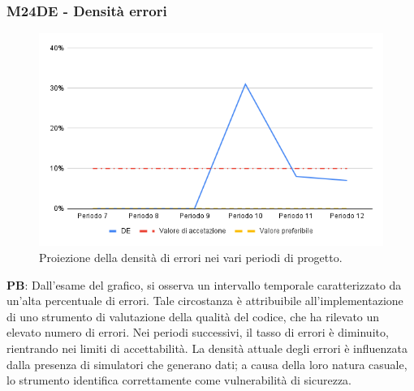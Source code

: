\subsubsection{M24DE - Densità errori}
\begin{figure}[H]
    \centering
    \includegraphics[width=1\textwidth]{../Images/PianoDiQualifica/M24DE.png}
    \caption{Proiezione della densità di errori nei vari periodi di progetto.}
    \label{fig:17}
\end{figure}

\textbf{PB}: Dall’esame del grafico, si osserva un intervallo temporale caratterizzato da un’alta percentuale di errori. Tale circostanza è attribuibile all’implementazione di uno strumento di valutazione della qualità del codice, che ha rilevato un elevato numero di errori. Nei periodi successivi, il tasso di errori è diminuito, rientrando nei limiti di accettabilità. La densità attuale degli errori è influenzata dalla presenza di simulatori che generano dati; a causa della loro natura casuale, lo strumento identifica correttamente come vulnerabilità di sicurezza. 